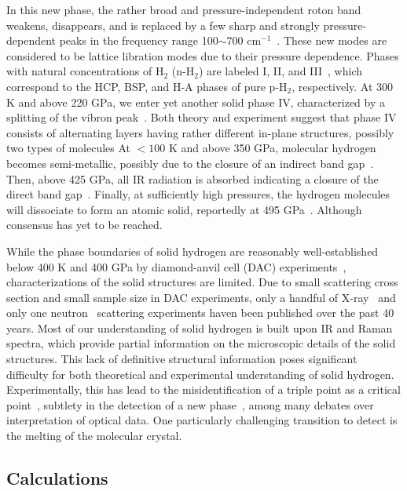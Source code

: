 In this new phase, the rather broad and pressure-independent roton band weakens, disappears, and is replaced by a few sharp and strongly pressure-dependent peaks in the frequency range 100$\sim$700 cm$^{-1}$~\cite{Goncharov1998}.
These new modes are considered to be lattice libration modes due to their pressure dependence.
Phases with natural concentrations of H$_2$ (n-H$_2$) are labeled I, II, and III~\cite{Dias2019}, which correspond to the HCP, BSP, and H-A phases of pure p-H$_2$, respectively.
At 300 K and above 220 GPa, we enter yet another solid phase IV, characterized by a splitting of the vibron peak~\cite{Zha2013}.
Both theory and experiment suggest that phase IV consists of alternating layers having rather different in-plane structures, possibly two types of molecules
At $<100$ K and above 350 GPa, molecular hydrogen becomes semi-metallic, possibly due to the closure of an indirect band gap~\cite{Eremets2019}.
Then, above 425 GPa, all IR radiation is absorbed indicating a closure of the direct band gap~\cite{Loubeyre2020}.
Finally, at sufficiently high pressures, the hydrogen molecules will dissociate to form an atomic solid, reportedly at 495 GPa~\cite{Silvera2017}. Although consensus has yet to be reached.

While the phase boundaries of solid hydrogen are reasonably well-established below 400 K and 400 GPa by diamond-anvil cell (DAC) experiments~\cite{Dias2019}, characterizations of the solid structures are limited. Due to small scattering cross section and small sample size in DAC experiments, only a handful of X-ray~\cite{Hazen1987,MAO1988,Loubeyre1996,Kawamura2002,Goncharenko2005a,Akahama2010,Ji2019} and only one neutron~\cite{Goncharenko2005a} scattering experiments haven been published over the past 40 years. Most of our understanding of solid hydrogen is built upon IR and Raman spectra, which provide partial information on the microscopic details of the solid structures. This lack of definitive structural information poses significant difficulty for both theoretical and experimental understanding of solid hydrogen. Experimentally, this has lead to the misidentification of a triple point as a critical point~\cite{Lorenzana1990,Cui1994}, subtlety in the detection of a new phase~\cite{Eremets2009,Howie2012}, among many debates over interpretation of optical data. One particularly challenging transition to detect is the melting of the molecular crystal.

\subsection{Calculations}
\label{sec:hsoli-calcs}

